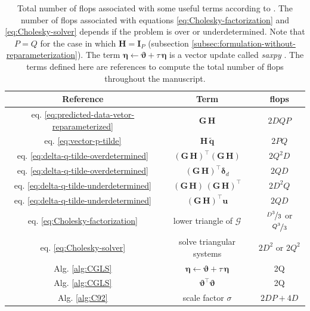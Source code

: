 \documentclass[utf8]{FrontiersinHarvard} %
\begin{document}
	\begin{table}[h!]
		\centering
		\begin{tabular}{c c c}
			Reference & Term & flops \\
			\hline
			eq. \ref{eq:predicted-data-vetor-reparameterized} & $\mathbf{G \, H}$ & $2DQP$ \\
			eq. \ref{eq:vector-p-tilde} & $\mathbf{H} \, \tilde{\mathbf{q}}$ & $2PQ$ \\
			eq. \ref{eq:delta-q-tilde-overdetermined} & $\left(\mathbf{G \, H}\right)^{\top}\left(\mathbf{G \, H}\right)$ & $2Q^{2}D$ \\
			eq. \ref{eq:delta-q-tilde-overdetermined} & $\left(\mathbf{G \, H}\right)^{\top}\boldsymbol{\delta}_{d} $ & $2QD$ \\
			eq. \ref{eq:delta-q-tilde-underdetermined} & $\left(\mathbf{G \, H}\right) \, \left(\mathbf{G \, H}\right)^{\top}$ & $2D^{2}Q$ \\
			eq. \ref{eq:delta-q-tilde-underdetermined} & $\left(\mathbf{G \, H}\right)^{\top}\mathbf{u}$ & $2QD$ \\
			eq. \ref{eq:Cholesky-factorization} & lower triangle of $\boldsymbol{\mathcal{G}}$ & $\nicefrac{D^{3}}{3}$ or $\nicefrac{Q^{3}}{3}$ \\
			eq. \ref{eq:Cholesky-solver} & solve triangular systems & $2D^{2}$ or $2Q^{2}$ \\
			Alg. \ref{alg:CGLS} & $\boldsymbol{\eta} \gets \boldsymbol{\vartheta} + \tau \, \boldsymbol{\eta}$ & 2Q \\
			Alg. \ref{alg:CGLS} & $\boldsymbol{\vartheta}^{\top} \boldsymbol{\vartheta}$ & 2Q \\
			Alg. \ref{alg:C92} & scale factor $\sigma$ & $2DP + 4D$ \\
		\end{tabular}
		\caption{
			Total number of flops associated with some useful terms according to \citet[][p. 12]{golub-vanloan2013}.
			The number of flops associated with equations \ref{eq:Cholesky-factorization} and \ref{eq:Cholesky-solver} 
			depends if the problem is over or underdetermined.
			Note that $P = Q$ for the case in which $\mathbf{H} = \mathbf{I}_{P}$ (subsection \ref{subsec:formulation-without-reparameterization}).
			The term $\boldsymbol{\eta} \gets \boldsymbol{\vartheta} + \tau \, \boldsymbol{\eta}$ is a vector 
			update called \textit{saxpy} \citep[][p. 4]{golub-vanloan2013}.
			The terms defined here are references to compute the total number of flops throughout the manuscript.
		}
		\label{tab:standard-flops}
	\end{table}
	
\end{document}
